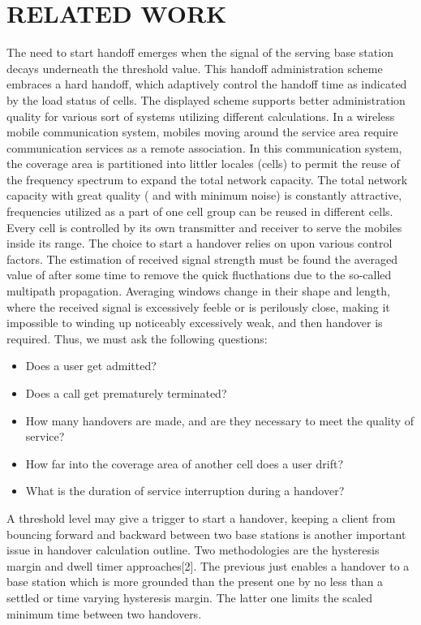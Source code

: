 \documentclass[a4paper]{IEEEtran}
\begin{document}
\section{\textbf{RELATED WORK}}
The need to start handoff emerges when the signal of the serving base station decays underneath the threshold value. This handoff administration scheme embraces a hard handoff, which adaptively control the handoff time as indicated by the load status of cells. The displayed scheme supports better administration quality for various sort of systems utilizing different calculations. In a wireless mobile communication system, mobiles moving around the service area require communication services as a remote association. In this communication system, the coverage area is partitioned into littler locales (cells) to permit the reuse of the frequency spectrum to expand the total network capacity. The total network capacity with great quality ( and with minimum noise) is constantly attractive, frequencies utilized as a part of one cell group can be reused in different cells. Every cell is controlled by its own transmitter and receiver to serve the mobiles inside its range. The choice to start a handover relies on upon various control factors. The estimation of received signal strength must be found the averaged value of after some time to remove the quick flucthations due to the so-called multipath propagation. Averaging windows change in their shape and length, where the received signal is excessively feeble or is perilously close, making it impossible to winding up noticeably excessively weak, and then handover is required. Thus, we must ask the following questions:
\begin{itemize}
\item{Does a user get admitted?}
\item{Does a call get prematurely terminated?}
\item{How many handovers are made, and are they necessary to meet the quality of service?}
\item{How far into the coverage area of another cell does a user drift?}
\item{What is the duration of service interruption during a handover?}
\end{itemize}
A threshold level may give a trigger to start a handover, keeping a client from bouncing forward and backward between two base stations is another important issue in handover calculation outline. Two methodologies are the hysteresis margin and dwell timer approaches[2]. The previous just enables a handover to a base station which is more grounded than the present one by no less than a settled or time varying hysteresis margin. The latter one limits the scaled minimum time between two handovers.
\pagebreak
\end{document}
